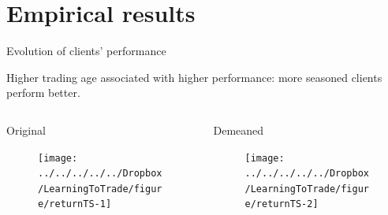 \documentclass{beamer}
\begin{document}
\section{Empirical results}

\begin{frame}{Evolution of clients' performance}

Higher trading age associated with higher performance: more seasoned clients perform better.

		\begin{columns}[t]
		\begin{column}{0.495\textwidth}
			\begin{block}{Original}
				\begin{figure}
					\texttt{[image: ../../../../../Dropbox/LearningToTrade/figure/returnTS-1]}
				\end{figure}
			\end{block}
		\end{column}

		\begin{column}{0.495\textwidth}
			\begin{block}{Demeaned}
				\begin{figure}
					\texttt{[image: ../../../../../Dropbox/LearningToTrade/figure/returnTS-2]}
				\end{figure}
			\end{block}
		\end{column}
	\end{columns}


\end{frame}
\end{document}
